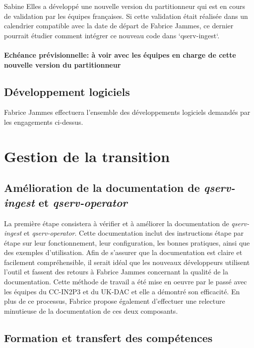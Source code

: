 \documentclass[french] {article}
\begin{document}
Sabine Elles a développé une nouvelle version du partitionneur qui est en cours de validation par les équipes françaises. Si cette validation était réalisée dans un calendrier compatible avec la date de départ de Fabrice Jammes, ce dernier pourrait étudier comment intégrer ce nouveau code dans `qserv-ingest`.

\paragraph{Echéance prévisionnelle: à voir avec les équipes en charge de cette nouvelle version du partitionneur}

\subsection{Développement logiciels}

Fabrice Jammes effectuera l'ensemble des développements logiciels demandés par les engagements ci-dessus.

\section{Gestion de la transition}

\subsection{Amélioration de la documentation de \textit{qserv-ingest} et \textit{qserv-operator}}

La première étape consistera à vérifier et à améliorer la documentation de \textit{qserv-ingest} et \textit{qserv-operator}.
Cette documentation inclut des instructions étape par étape sur leur fonctionnement, leur configuration, les bonnes pratiques, ainsi que des exemples d'utilisation.
Afin de s'assurer que la documentation est claire et facilement compréhensible, il serait idéal que les nouveaux développeurs utilisent l'outil et fassent des retours à Fabrice Jammes concernant
la qualité de la documentation. Cette méthode de travail a été mise en oeuvre par le passé avec les équipes du CC-IN2P3 et du UK-DAC et elle a démontré son efficacité. En plus de ce processus,
Fabrice propose également d'effectuer une relecture minutieuse de la documentation de ces deux composants.

\subsection{Formation et transfert des compétences}
\end{document}
